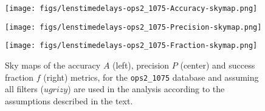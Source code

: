 


\begin{figure*}[!ht]
  \capstart
  \begin{minipage}[b]{\linewidth}
    \begin{minipage}[b]{0.32\linewidth}
      \centering\texttt{[image: figs/lenstimedelays-ops2\_1075-Accuracy-skymap.png]}
    \end{minipage} \hfill
    \begin{minipage}[b]{0.32\linewidth}
      \centering\texttt{[image: figs/lenstimedelays-ops2\_1075-Precision-skymap.png]}
    \end{minipage} \hfill
    \begin{minipage}[b]{0.32\linewidth}
      \centering\texttt{[image: figs/lenstimedelays-ops2\_1075-Fraction-skymap.png]}
    \end{minipage}
  \end{minipage}
\caption{Sky maps of the accuracy $A$ (left), precision $P$ (center) and
success fraction $f$ (right) metrics, for the \texttt{ops2\_1075} \OpSim
database and assuming all filters ($ugrizy$) are used in the analysis
according to the assumptions described in the text.}
\label{fig:lenstimedelays:results}
\end{figure*}



